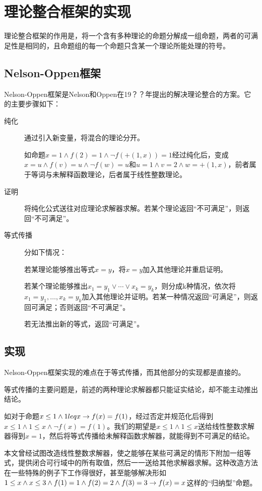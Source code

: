 \chapter{理论整合框架的实现}
\label{chap:no}

理论整合框架的作用是，将一个含有多种理论的命题分解成一组命题，两者的可满足性是相同的，且命题组的每一个命题只含某一个理论所能处理的符号。

\section{Nelson-Oppen框架}
Nelson-Oppen框架是Nelson和Oppen在19？？年提出的解决理论整合的方案。它的主要步骤如下：
\begin{description}
  \item[纯化] 通过引入新变量，将混合的理论分开。

    如命题$x = 1 \land f(2) = 1 \land \lnot f(+(1,x))=1$经过纯化后，变成$x = u \land f(v) = u \land \lnot f(w)=u$和$u = 1 \land v = 2 \land w = +(1, x)$，前者属于等词与未解释函数理论，后者属于线性整数理论。
  \item[证明] 将纯化公式送往对应理论求解器求解。若某个理论返回``不可满足''，则返回``不可满足''。
  \item[等式传播] 分如下情况：

    若某理论能够推出等式$x = y$，将$x = y$加入其他理论并重启证明。

    若某个理论能够推出$x_1 = y_1 \lor \cdots \lor x_k = y_k$，则分成k种情况，依次将$x_1 = y_1, \dots, x_k = y_k$加入其他理论并证明。若某一种情况返回``可满足''，则返回可满足；否则返回``不可满足''。

    若无法推出新的等式，返回``可满足''。
\end{description}

\section{实现}
Nelson-Oppen框架实现的难点在于等式传播，而其他部分的实现都是直接的。

等式传播的主要问题是，前述的两种理论求解器都只能证实结论，却不能主动推出结论。

如对于命题$x \leq 1 \land 1 leq x \rightarrow f(x) = f(1)$，经过否定并规范化后得到$x \leq 1 \land 1 \leq x \land \lnot f(x) = f(1)$。我们的期望是$x \leq 1 \land 1 \leq x$送给线性整数求解器得到$x=1$，然后将等式传播给未解释函数求解器，就能得到不可满足的结论。

本文曾经试图改造线性整数求解器，使之能够在某些可满足的情形下附加一组等式，提供闭合可行域中的所有取值，然后一一送给其他求解器求解。这种改造方法在一些特殊的例子下工作得很好，甚至能够解决形如$1 \leq x \land x \leq 3 \land f(1)=1 \land f(2)=2 \land f(3)=3 \rightarrow f(x)=x$这样的``归纳型''命题。

